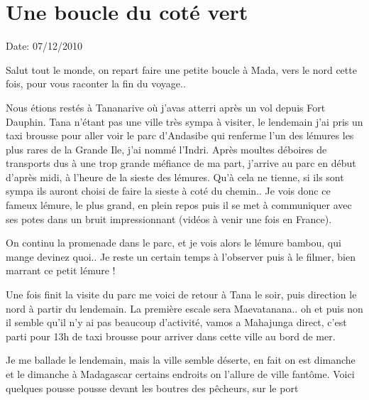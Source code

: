 \section{Une boucle du coté vert}

Date: 07/12/2010

\begin{multicols}{2}

Salut tout le monde, on repart faire une petite boucle à Mada, vers le nord cette fois, pour vous raconter la fin du voyage..

Nous étions restés à Tananarive où j'avas atterri après un vol depuis Fort Dauphin. Tana n'étant pas une ville très sympa à visiter, le lendemain j'ai pris un taxi brousse pour aller voir le parc d'Andasibe qui renferme l'un des lémures les plus rares de la Grande Ile, j'ai nommé l'Indri. Après moultes déboires de transports dus à une trop grande méfiance de ma part, j'arrive au parc en début d'après midi, à l'heure de la sieste des lémures. Qu'à cela ne tienne, si ils sont sympa ils auront choisi de faire la sieste à coté du chemin.. Je vois donc ce fameux lémure, le plus grand, en plein repos puis il se met à communiquer avec ses potes dans un bruit impressionnant (vidéos à venir une fois en France).


On continu la promenade dans le parc, et je vois alors le lémure bambou, qui mange devinez quoi.. Je reste un certain temps à l'observer puis à le filmer, bien marrant ce petit lémure !


Une fois finit la visite du parc me voici de retour à Tana le soir, puis direction le nord à partir du lendemain. La première escale sera Maevatanana.. oh et puis non il semble qu'il n'y ai pas beaucoup d'activité, vamos a Mahajunga direct, c'est parti pour 13h de taxi brousse pour arriver dans cette ville au bord de mer.

Je me ballade le lendemain, mais la ville semble déserte, en fait on est dimanche et le dimanche à Madagascar certains endroits on l'allure de ville fantôme. Voici quelques pousse pousse devant les boutres des pêcheurs, sur le port



\end{multicols}
